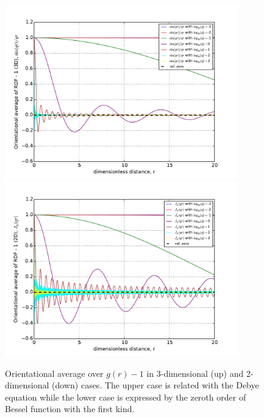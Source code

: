 \documentclass[10pt, a4paper]{article}
\begin{document}
\begin{appendices}
    \begin{figure}
      \centering
      \includegraphics[width=0.9\textwidth]{figures/kernel.pdf}\\
      \includegraphics[width=0.9\textwidth]{figures/J_0_qr.pdf}
      \caption{Orientational average over $g(r)-1$ in 3-dimensional (up) and 2-dimensional (down) cases. The upper case is related with the Debye equation while the lower case is expressed by the zeroth order of Bessel function with the first kind.}
      \label{fig:iso_av_orientation}
    \end{figure}



\end{appendices}
\end{document}
